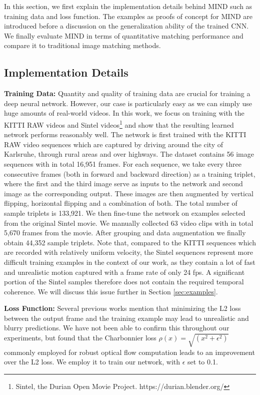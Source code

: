 \documentclass[runningheads]{llncs}
\begin{document}
	In this section, we first explain the implementation details behind MIND such as training data and loss function. The examples as proofs of concept for MIND are introduced before a discussion on the generalization ability of the trained CNN. We finally evaluate MIND in terms of quantitative matching performance and compare it to traditional image matching methods. 
	
	\vspace{-0.1cm}
	\subsection{Implementation Details}
	
	\noindent\textbf{Training Data:} Quantity and quality of training data are crucial for training a deep neural network. However, our case is particularly easy as we can simply use huge amounts of real-world videos. In this work, we focus on training with the KITTI RAW videos \cite{Geiger2013IJRR} and Sintel videos\footnote{Sintel, the Durian Open Movie Project. https://durian.blender.org/} and show that the resulting learned network performs reasonably well. The network is first trained with the KITTI RAW video sequences which are captured by driving around the city of Karlsruhe, through rural areas and over highways. The dataset contains 56 image sequences with in total 16,951 frames. For each sequence, we take every three consecutive frames (both in forward and backward direction) as a training triplet, where the first and the third image serve as inputs to the network and second image as the corresponding output. These images are then augmented by vertical flipping, horizontal flipping and a combination of both. The total number of sample triplets is 133,921. We then fine-tune the network on examples selected from the original Sintel movie. We manually collected 63 video clips with in total 5,670 frames from the movie. After grouping and data augmentation we finally obtain 44,352 sample triplets. Note that, compared to the KITTI sequences which are recorded with relatively uniform velocity, the Sintel sequences represent more difficult training examples in the context of our work, as they contain a lot of fast and unrealistic motion captured with a frame rate of only 24 fps. A significant portion of the Sintel samples therefore does not contain the required temporal coherence. We will discuss this issue further in Section \ref{sec:examples}.
		
	\vspace{+0.1cm}
	\noindent\textbf{Loss Function:} Several previous works \cite{goroshin2015learning,wang2015unsupervised} mention that minimizing the L2 loss between the output frame and the training example may lead to unrealistic and blurry predictions. We have not been able to confirm this throughout our experiments, but found that the Charbonnier loss $\rho(x)=\sqrt{(x^2 + \epsilon ^2)}$ commonly employed for robust optical flow computation \cite{sun2014quantitative} leads to an improvement over the L2 loss. We employ it to train our network, with $\epsilon$ set to 0.1.
	
\end{document}
